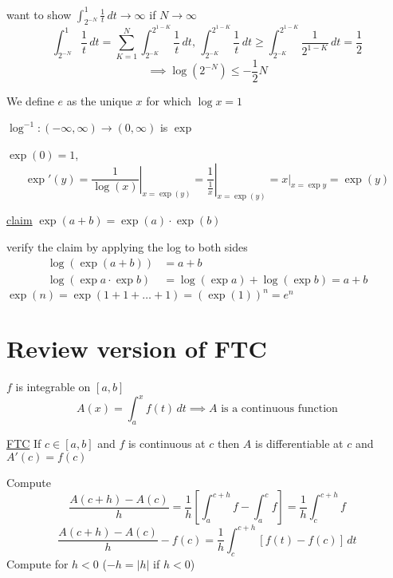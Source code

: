 want to show $\displaystyle\int_{2^{-N}}^1 \frac{1}{t}\,dt \to \infty$ if $N \to \infty$
\[\int_{2^{-N}}^1 \frac{1}{t}\,dt = \sum_{K=1}^{N} \int_{2^{-K}}^{2^{1-K}} \frac{1}{t}\,dt,\, \int_{2^{-K}}^{2^{1-K}} \frac{1}{t}\,dt \ge \int_{2^{-K}}^{2^{1-K}} \frac{1}{2^{1-K}}\,dt = \frac{1}{2}\]
\[ \implies \log(2^{-N}) \le -\frac{1}{2}N\]

We define $e$ as the unique $x$ for which $\log x = 1$

\begin{center}
\end{center}

$\log^{-1}:(-\infty, \infty) \to (0, \infty)$ is $\exp$

$\exp(0) = 1$, 
$$\exp'(y) = \left.\frac{1}{\log(x)}\right|_{x=\exp(y)} = \left.\frac{1}{\frac{1}{x}}\right|_{x=\exp(y)}=\left.x\right|_{x=\exp{y}} = \exp(y)$$


\underline{claim}
$\exp(a+b) = \exp(a)\cdot\exp(b)$

verify the claim by applying the log to both sides
\begin{align*}
  \log(\exp(a+b)) &= a + b\\
  \log(\exp a \cdot \exp b) &= \log(\exp a) + \log(\exp b) = a + b
\end{align*}
$\exp(n) = \exp(1 + 1 + \dotsc + 1) = (\exp(1))^n = e^n$

\section{Review version of FTC}

$f$ is integrable on $[a, b]$
\[A(x) = \int_a^x f(t)\,dt \implies A \text{ is a continuous function}\]

\underline{FTC} If $c \in [a, b]$ and $f$ is continuous at $c$ then $A$ is differentiable at $c$ and $A'(c) = f(c)$

Compute
\[\frac{A(c+h) - A(c)}{h} = \frac{1}{h}\left[\int_a^{c+h}f - \int_a^c f\right] = \frac{1}{h}\int_c^{c+h}f \]
\[\frac{A(c+h) - A(c)}{h} - f(c) = \frac{1}{h}\int_c^{c+h}\left[f(t) - f(c)\right]\,dt\]
Compute for $h < 0$ ($-h = |h|$ if $h < 0$)

